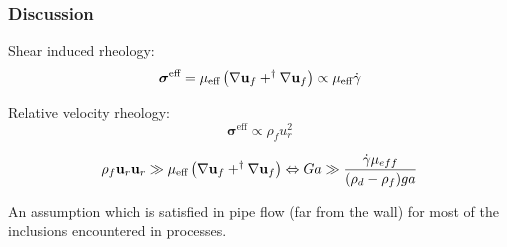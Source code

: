\documentclass{sintefbeamer}
\begin{document}
\section*{}






\begin{frame}
  \frametitle{Discussion}

Shear induced rheology:
 \begin{equation}
\bm\sigma^\text{eff} =  \mu_\text{eff} \left(\mathbf{\nabla} \textbf{u}_f + ^\dagger \mathbf{\nabla} \textbf{u}_f\right) \propto \mu_\text{eff} \dot{\gamma}
\end{equation}

Relative velocity rheology:
\begin{equation}
  \bm\sigma^\text{eff}
  \propto \rho_f u_r^2
\end{equation}

\begin{equation}
  \rho_f \textbf{u}_r \textbf{u}_r \gg \mu_\text{eff} \left(\mathbf{\nabla} \textbf{u}_f + ^\dagger \mathbf{\nabla} \textbf{u}_f\right) \Leftrightarrow Ga \gg \frac{\dot{\gamma}\mu_{eff}}{(\rho_d-\rho_f)g a}
\end{equation}

An assumption which is satisfied in pipe flow (far from the wall) for most of the inclusions encountered in processes.%

 
\end{frame}
\end{document}
